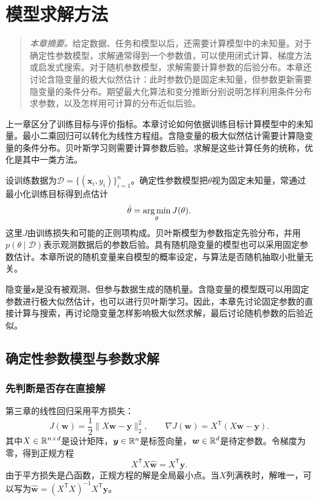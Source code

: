 \chapter{模型求解方法}
\label{chap:model-solving}

\begin{quote}\small
\textit{本章摘要。}给定数据、任务和模型以后，还需要计算模型中的未知量。对于确定性参数模型，求解通常得到一个参数值，可以使用闭式计算、梯度方法或启发式搜索。对于随机参数模型，求解需要计算参数的后验分布。本章还讨论含隐变量的极大似然估计：此时参数仍是固定未知量，但参数更新需要隐变量的条件分布。期望最大化算法和变分推断分别说明怎样利用条件分布求参数，以及怎样用可计算的分布近似后验。
\end{quote}

上一章区分了训练目标与评价指标。本章讨论如何依据训练目标计算模型中的未知量。最小二乘回归可以转化为线性方程组。含隐变量的极大似然估计需要计算隐变量的条件分布。贝叶斯学习则需要计算参数后验。求解是这些计算任务的统称，优化是其中一类方法。

设训练数据为$\mathcal D=\{(\bm x_i,y_i)\}_{i=1}^n$。确定性参数模型把$\theta$视为固定未知量，常通过最小化训练目标得到点估计
\begin{equation}
 \hat\theta=\mathop{\mathrm{arg\,min}}_\theta J(\theta).
 \label{eq:solving-deterministic-objective}
\end{equation}
这里$J$由训练损失和可能的正则项构成。贝叶斯模型为参数指定先验分布，并用$p(\theta\mid\mathcal D)$表示观测数据后的参数后验。具有随机隐变量的模型也可以采用固定参数估计。本章所说的随机变量来自模型的概率设定，与算法是否随机抽取小批量无关。

隐变量$\bm z$是没有被观测、但参与数据生成的随机量。含隐变量的模型既可以用固定参数进行极大似然估计，也可以进行贝叶斯学习。因此，本章先讨论固定参数的直接计算与搜索，再讨论隐变量怎样影响极大似然求解，最后讨论随机参数的后验近似。

\section{确定性参数模型与参数求解}

\subsection{先判断是否存在直接解}
第三章的线性回归采用平方损失：
\begin{equation}
 J(\bm w)=\frac12\|X\bm w-\bm y\|_2^2,
 \qquad \nabla J(\bm w)=X^{\mathsf T}(X\bm w-\bm y).
 \label{eq:solving-least-squares}
\end{equation}
其中$X\in\mathbb{R}^{n\times d}$是设计矩阵，$\bm y\in\mathbb{R}^n$是标签向量，$\bm w\in\mathbb{R}^d$是待定参数。令梯度为零，得到正规方程
\begin{equation}
 X^{\mathsf T}X\hat{\bm w}=X^{\mathsf T}\bm y.
 \label{eq:solving-normal-equation}
\end{equation}
由于平方损失是凸函数，正规方程的解是全局最小点。当$X$列满秩时，解唯一，可以写为$\hat{\bm w}=(X^{\mathsf T}X)^{-1}X^{\mathsf T}\bm y$。

